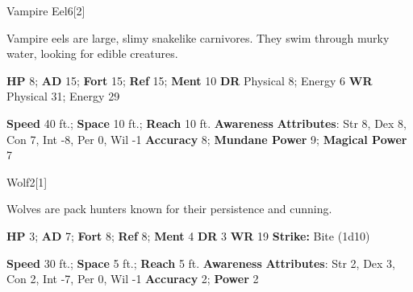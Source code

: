   \begin{monsection}{Vampire Eel}{6}[2]
    \vspace{-1em}\vspace{-1em}
    \vspace{0em}

    
      Vampire eels are large, slimy snakelike carnivores.
      They swim through murky water, looking for edible creatures.
    

    \begin{spellcontent}
      \begin{spelltargetinginfo}
        \pari \textbf{HP} 8;
          \textbf{AD} 15;
          \textbf{Fort} 15;
          \textbf{Ref} 15;
          \textbf{Ment} 10
        \pari \textbf{DR} Physical 8; Energy 6
        \pari \textbf{WR} Physical 31; Energy 29
        
      \end{spelltargetinginfo}
    \end{spellcontent}
    \begin{monsterfooter}
      \pari \textbf{Speed} 40 ft.;
        \textbf{Space} 10 ft.;
        \textbf{Reach} 10 ft.
      \pari \textbf{Awareness} 
      \pari \textbf{Attributes}:
        Str 8, Dex 8,
        Con 7, Int -8,
        Per 0, Wil -1
      \pari \textbf{Accuracy} 8;
        \textbf{Mundane Power} 9;
      \textbf{Magical Power} 7
    \end{monsterfooter}
  \end{monsection}
  
  
  \begin{monsection}{Wolf}{2}[1]
    \vspace{-1em}\vspace{-1em}
    \vspace{0em}

    
      Wolves are pack hunters known for their persistence and cunning.
    

    \begin{spellcontent}
      \begin{spelltargetinginfo}
        \pari \textbf{HP} 3;
          \textbf{AD} 7;
          \textbf{Fort} 8;
          \textbf{Ref} 8;
          \textbf{Ment} 4
        \pari \textbf{DR} 3
        \pari \textbf{WR} 19
        \pari \textbf{Strike:}
            Bite  (1d10)
      \end{spelltargetinginfo}
    \end{spellcontent}
    \begin{monsterfooter}
      \pari \textbf{Speed} 30 ft.;
        \textbf{Space} 5 ft.;
        \textbf{Reach} 5 ft.
      \pari \textbf{Awareness} 
      \pari \textbf{Attributes}:
        Str 2, Dex 3,
        Con 2, Int -7,
        Per 0, Wil -1
      \pari \textbf{Accuracy} 2;
        \textbf{Power} 2
    \end{monsterfooter}
  \end{monsection}
  
